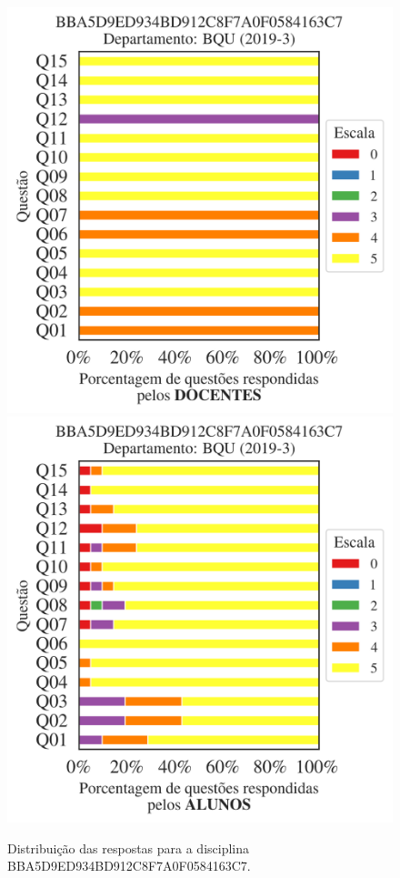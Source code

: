 \documentclass[a4paper,10pt]{article}
\begin{document}
\begin{figure}[h]
\centering
\includegraphics[width=0.485\linewidth]{analise_disciplina_departamento_BQU_BBA5D9ED934BD912C8F7A0F0584163C7_docentes.png}
\includegraphics[width=0.485\linewidth]{analise_disciplina_departamento_BQU_BBA5D9ED934BD912C8F7A0F0584163C7_alunos.png}
\caption{\label{fig:analise_geral_departamento}                Distribuição das respostas para a disciplina BBA5D9ED934BD912C8F7A0F0584163C7. }
\end{figure}
\end{document}
